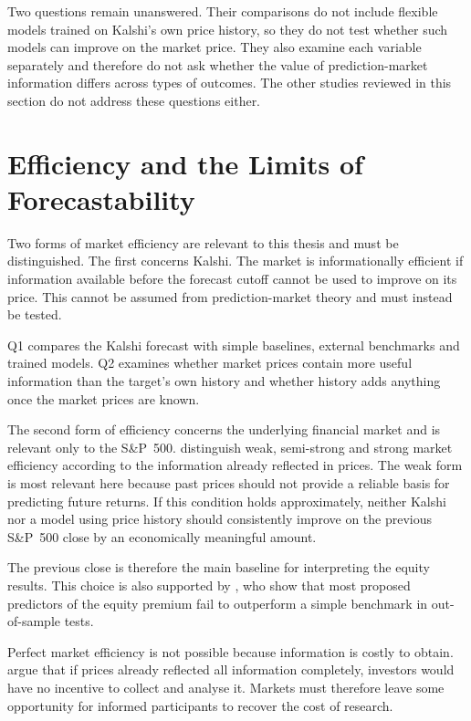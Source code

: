 \documentclass[12pt,a4paper]{report}
\begin{document}
Two questions remain unanswered. Their comparisons do not include flexible
models trained on Kalshi's own price history, so they do not test whether such
models can improve on the market price. They also examine each variable
separately and therefore do not ask whether the value of prediction-market
information differs across types of outcomes. The other studies reviewed in
this section do not address these questions either.

\section{Efficiency and the Limits of Forecastability}
\label{sec:lit-efficiency}

Two forms of market efficiency are relevant to this thesis and must be
distinguished. The first concerns Kalshi. The market is informationally
efficient if information available before the forecast cutoff cannot be used to
improve on its price. This cannot be assumed from prediction-market theory and
must instead be tested.

Q1 compares the Kalshi forecast with simple baselines, external benchmarks and
trained models. Q2 examines whether market prices contain more useful
information than the target's own history and whether history adds anything
once the market prices are known.

The second form of efficiency concerns the underlying financial market and is
relevant only to the S\&P~500. \textcite{fama1970} distinguish weak,
semi-strong and strong market efficiency according to the information already
reflected in prices. The weak form is most relevant here because past prices
should not provide a reliable basis for predicting future returns. If this
condition holds approximately, neither Kalshi nor a model using price history
should consistently improve on the previous S\&P~500 close by an economically
meaningful amount.

The previous close is therefore the main baseline for interpreting the equity
results. This choice is also supported by \textcite{welch2008}, who show that
most proposed predictors of the equity premium fail to outperform a simple
benchmark in out-of-sample tests.

Perfect market efficiency is not possible because information is costly to
obtain. \textcite{grossman1980} argue that if prices already reflected all
information completely, investors would have no incentive to collect and
analyse it. Markets must therefore leave some opportunity for informed
participants to recover the cost of research.
\end{document}
